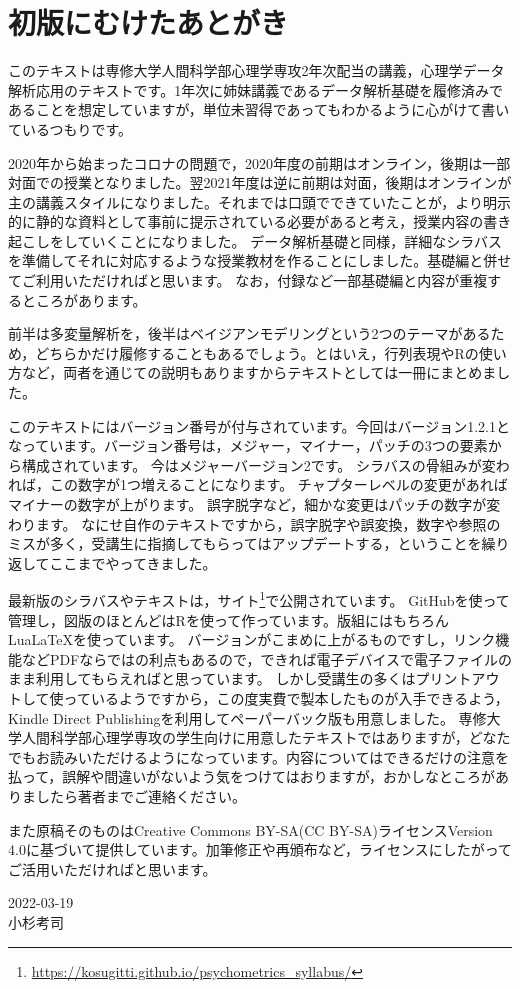\section*{初版にむけたあとがき}

このテキストは専修大学人間科学部心理学専攻2年次配当の講義，心理学データ解析応用のテキストです。1年次に姉妹講義であるデータ解析基礎を履修済みであることを想定していますが，単位未習得であってもわかるように心がけて書いているつもりです。

2020年から始まったコロナの問題で，2020年度の前期はオンライン，後期は一部対面での授業となりました。翌2021年度は逆に前期は対面，後期はオンラインが主の講義スタイルになりました。それまでは口頭でできていたことが，より明示的に静的な資料として事前に提示されている必要があると考え，授業内容の書き起こしをしていくことになりました。
データ解析基礎と同様，詳細なシラバスを準備してそれに対応するような授業教材を作ることにしました。基礎編と併せてご利用いただければと思います。
なお，付録など一部基礎編と内容が重複するところがあります。

前半は多変量解析を，後半はベイジアンモデリングという2つのテーマがあるため，どちらかだけ履修することもあるでしょう。とはいえ，行列表現やRの使い方など，両者を通じての説明もありますからテキストとしては一冊にまとめました。



このテキストにはバージョン番号が付与されています。今回はバージョン1.2.1となっています。バージョン番号は，メジャー，マイナー，パッチの3つの要素から構成されています。
今はメジャーバージョン2です。
シラバスの骨組みが変われば，この数字が1つ増えることになります。
チャプターレベルの変更があればマイナーの数字が上がります。
誤字脱字など，細かな変更はパッチの数字が変わります。
なにせ自作のテキストですから，誤字脱字や誤変換，数字や参照のミスが多く，受講生に指摘してもらってはアップデートする，ということを繰り返してここまでやってきました。


最新版のシラバスやテキストは，サイト\footnote{\url{https://kosugitti.github.io/psychometrics_syllabus/}}で公開されています。
GitHubを使って管理し，図版のほとんどはRを使って作っています。版組にはもちろんLua\LaTeX を使っています。
バージョンがこまめに上がるものですし，リンク機能などPDFならではの利点もあるので，できれば電子デバイスで電子ファイルのまま利用してもらえればと思っています。
しかし受講生の多くはプリントアウトして使っているようですから，この度実費で製本したものが入手できるよう，Kindle Direct Publishingを利用してペーパーバック版も用意しました。
専修大学人間科学部心理学専攻の学生向けに用意したテキストではありますが，どなたでもお読みいただけるようになっています。内容についてはできるだけの注意を払って，誤解や間違いがないよう気をつけてはおりますが，おかしなところがありましたら著者までご連絡ください。

また原稿そのものはCreative Commons BY-SA(CC BY-SA)ライセンスVersion 4.0に基づいて提供しています。加筆修正や再頒布など，ライセンスにしたがってご活用いただければと思います。


\begin{flushright}
	2022-03-19\\
	小杉考司
\end{flushright}